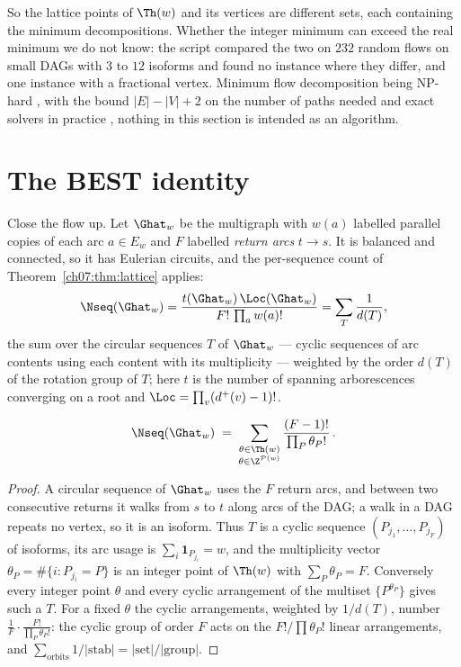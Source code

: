 So the lattice points of $\Th(w)$ and its vertices are different sets, each containing the
minimum decompositions. Whether the integer minimum can exceed the real minimum we do not
know: the script compared the two on $232$ random flows on small DAGs with $3$ to $12$
isoforms and found no instance where they differ, and one instance with a fractional
vertex. Minimum flow decomposition being NP-hard \cite{HHKS12}, with the bound
$|E|-|V|+2$ on the number of paths needed \cite{VCCM08} and exact solvers in practice
\cite{KKO18,DT22}, nothing in this section is intended as an algorithm.

\section{The BEST identity}\label{ch17:sec:best}

Close the flow up. Let $\Ghat_w$ be the multigraph with $w(a)$ labelled parallel copies of
each arc $a\in E_w$ and $F$ labelled \emph{return arcs} $t\to s$. It is balanced and
connected, so it has Eulerian circuits, and the per-sequence count of Theorem~\ref{ch07:thm:lattice} applies:
\[
  \Nseq(\Ghat_w)=\frac{t(\Ghat_w)\,\Loc(\Ghat_w)}{F!\,\prod_{a}w(a)!}
  =\sum_{T}\frac1{d(T)},
\]
the sum over the circular sequences $T$ of $\Ghat_w$ --- cyclic sequences of arc contents
using each content with its multiplicity --- weighted by the order $d(T)$ of the rotation
group of $T$; here $t$ is the number of spanning arborescences converging on a root and
$\Loc=\prod_v(d^+(v)-1)!$.

\begin{theorem}\label{ch17:thm:best}
\[
  \Nseq(\Ghat_w)\;=\;\sum_{\substack{\theta\in\Th(w)\\ \theta\in\Z^{\mathcal P(w)}}}\frac{(F-1)!}{\prod_{P}\theta_P!}\,.
\]
\end{theorem}

\begin{proof}
A circular sequence of $\Ghat_w$ uses the $F$ return arcs, and between two consecutive
returns it walks from $s$ to $t$ along arcs of the DAG; a walk in a DAG repeats no vertex,
so it is an isoform. Thus $T$ is a cyclic sequence $(P_{j_1},\dots,P_{j_F})$ of isoforms,
its arc usage is $\sum_i\mathbf 1_{P_{j_i}}=w$, and the multiplicity vector
$\theta_P=\#\{i:P_{j_i}=P\}$ is an integer point of $\Th(w)$ with $\sum_P\theta_P=F$.
Conversely every integer point $\theta$ and every cyclic arrangement of the multiset
$\{P^{\theta_P}\}$ gives such a $T$. For a fixed $\theta$ the cyclic arrangements, weighted by
$1/d(T)$, number $\frac1F\cdot\frac{F!}{\prod_P\theta_P!}$: the cyclic group of order $F$
acts on the $F!/\prod\theta_P!$ linear arrangements, and $\sum_{\text{orbits}}1/|\mathrm{stab}|
=|\text{set}|/|\text{group}|$.
\end{proof}


